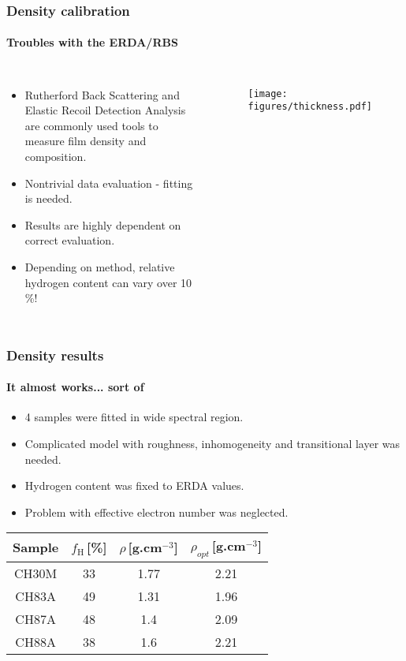 \documentclass{beamer}
\begin{document}
\begin{frame}
   \frametitle{Density calibration}
   \framesubtitle{Troubles with the ERDA/RBS}
	
	\begin{columns}[c]
   \begin{itemize}
	\item Rutherford Back Scattering and Elastic Recoil Detection Analysis are commonly used tools to measure film density and composition.
   \item Nontrivial data evaluation - fitting is needed.
   \item Results are highly dependent on correct evaluation.
	\item Depending on method, relative hydrogen content can vary over 10\,\%!
   \end{itemize}
	\begin{figure}
	\texttt{[image: figures/thickness.pdf]}
	\end{figure}
   \end{columns}

\end{frame}

\begin{frame}
   \frametitle{Density results}
   \framesubtitle{It almost works... sort of}
	
   \begin{itemize}
	\item 4 samples were fitted in wide spectral region.
   \item Complicated model with roughness, inhomogeneity and transitional layer was needed.
   \item Hydrogen content was fixed to ERDA values.
   \item Problem with effective electron number was neglected.
   \end{itemize}
	\begin{table}
	\begin{tabular}{cccc}
	Sample & $f_\mathrm{H}$\,[\%] & $\rho$\,[g.cm$^{-3}$] & $\rho_{opt}$\,[g.cm$^{-3}$] \\ \hline \hline
	CH30M & 33 & 1.77 & 2.21\\
	CH83A & 49 & 1.31 & 1.96\\
	CH87A & 48 & 1.4 & 2.09\\
	CH88A & 38 & 1.6 & 2.21\\
	\end{tabular}
	\end{table}
\end{frame}
\end{document}

